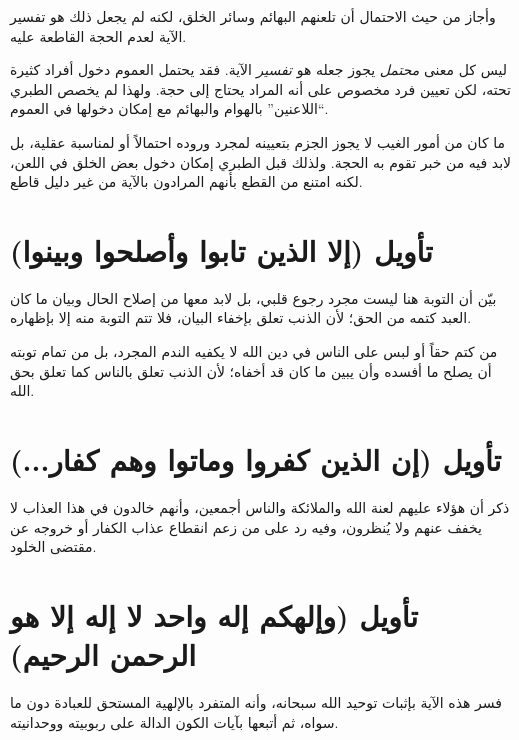 وأجاز من حيث الاحتمال أن تلعنهم البهائم وسائر الخلق، لكنه لم يجعل ذلك هو تفسير الآية لعدم الحجة القاطعة عليه.

\begin{fawaid}
ليس كل معنى \textit{محتمل} يجوز جعله هو \textit{تفسير} الآية. فقد يحتمل العموم دخول أفراد كثيرة تحته، لكن تعيين فرد مخصوص على أنه المراد يحتاج إلى حجة. ولهذا لم يخصص الطبري ``اللاعنين'' بالهوام والبهائم مع إمكان دخولها في العموم.
\end{fawaid}

\begin{fawaid}
ما كان من أمور الغيب لا يجوز الجزم بتعيينه لمجرد وروده احتمالاً أو لمناسبة عقلية، بل لابد فيه من خبر تقوم به الحجة. ولذلك قبل الطبري إمكان دخول بعض الخلق في اللعن، لكنه امتنع من القطع بأنهم المرادون بالآية من غير دليل قاطع.
\end{fawaid}

\separator

\section{تأويل (إلا الذين تابوا وأصلحوا وبينوا)}
بيّن  أن التوبة هنا ليست مجرد رجوع قلبي، بل لابد معها من إصلاح الحال وبيان ما كان العبد كتمه من الحق؛ لأن الذنب تعلق بإخفاء البيان، فلا تتم التوبة منه إلا بإظهاره.

\begin{fawaid}
من كتم حقاً أو لبس على الناس في دين الله لا يكفيه الندم المجرد، بل من تمام توبته أن يصلح ما أفسده وأن يبين ما كان قد أخفاه؛ لأن الذنب تعلق بالناس كما تعلق بحق الله.
\end{fawaid}

\separator

\section{تأويل (إن الذين كفروا وماتوا وهم كفار...)}
ذكر  أن هؤلاء عليهم لعنة الله والملائكة والناس أجمعين، وأنهم خالدون في هذا العذاب لا يخفف عنهم ولا يُنظرون، وفيه رد على من زعم انقطاع عذاب الكفار أو خروجه عن مقتضى الخلود.

\separator

\section{تأويل (وإلهكم إله واحد لا إله إلا هو الرحمن الرحيم)}
فسر  هذه الآية بإثبات توحيد الله سبحانه، وأنه المتفرد بالإلهية المستحق للعبادة دون ما سواه، ثم أتبعها بآيات الكون الدالة على ربوبيته ووحدانيته.

